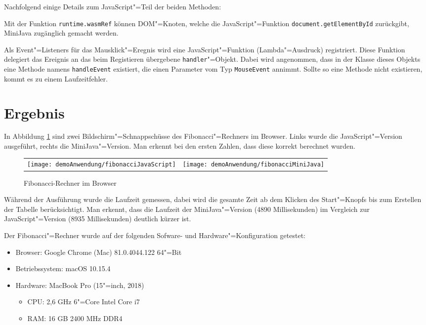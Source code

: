 


Nachfolgend einige Details zum JavaScript"=Teil der beiden Methoden:

Mit der Funktion \lstinline{runtime.wasmRef} können DOM"=Knoten, welche die JavaScript"=Funktion \lstinline{document.getElementById} zurückgibt, MiniJava zugänglich gemacht werden.

Als Event"=Listeners für das Mausklick"=Eregnis wird eine JavaScript"=Funktion (Lambda"=Ausdruck) registriert. Diese Funktion delegiert das Ereignis an das beim Registieren übergebene \lstinline{handler}"=Objekt. Dabei wird angenommen, dass in der Klasse dieses Objekts eine Methode namens \lstinline{handleEvent} existiert, die einen Parameter vom Typ \lstinline{MouseEvent} annimmt. Sollte so eine Methode nicht existieren, kommt es zu einem Laufzeitfehler.

\section{Ergebnis}

In Abbildung \ref{fig:fibCalculatorBrowser} sind zwei Bildschirm"=Schnappschüsse des Fibonacci"=Rechners im Browser. Links wurde die JavaScript"=Version ausgeführt, rechts die MiniJava"=Version. Man erkennt bei den ersten Zahlen, dass diese korrekt berechnet wurden.

\begin{figure}[]
    \centering
    \begin{tabular}{c c}
        \texttt{[image: demoAnwendung/fibonacciJavaScript]} & \texttt{[image: demoAnwendung/fibonacciMiniJava]}
    \end{tabular}
    \caption{Fibonacci-Rechner im Browser}
    \label{fig:fibCalculatorBrowser}
\end{figure}

Während der Ausführung wurde die Laufzeit gemessen, dabei wird die gesamte Zeit ab dem Klicken des Start"=Knopfs bis zum Erstellen der Tabelle berücksichtigt. Man erkennt, dass die Laufzeit der MiniJava"=Version (4890 Millisekunden) im Vergleich zur JavaScript"=Version (8935 Millisekunden) deutlich kürzer ist.

Der Fibonacci"=Rechner wurde auf der folgenden Sofware- und Hardware"=Konfiguration getestet:
\begin{itemize}
    \item Browser: Google Chrome (Mac) 81.0.4044.122 64"=Bit
    \item Betriebssystem: macOS 10.15.4
    \item Hardware: MacBook Pro (15"=inch, 2018)
    \begin{itemize}
        \item CPU: 2,6 GHz 6"=Core Intel Core i7
        \item RAM: 16 GB 2400 MHz DDR4
    \end{itemize}
\end{itemize}


